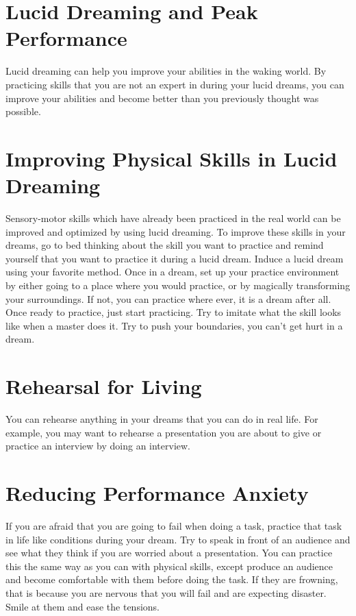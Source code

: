 \documentclass{report}
\begin{document}
\section{Lucid Dreaming and Peak Performance}
Lucid dreaming can help you improve your abilities in the waking world. By practicing skills that you are not an expert in during your lucid dreams, you can improve your abilities and become better than you previously thought was possible. 

\section{Improving Physical Skills in Lucid Dreaming}
Sensory-motor skills which have already been practiced in the real world can be improved and optimized by using lucid dreaming. To improve these skills in your dreams, go to bed thinking about the skill you want to practice and remind yourself that you want to practice it during a lucid dream. Induce a lucid dream using your favorite method. Once in a dream, set up your practice environment by either going to a place where you would practice, or by magically transforming your surroundings. If not, you can practice where ever, it is a dream after all. Once ready to practice, just start practicing. Try to imitate what the skill looks like when a master does it. Try to push your boundaries, you can't get hurt in a dream. 

\section{Rehearsal for Living}
You can rehearse anything in your dreams that you can do in real life. For example, you may want to rehearse a presentation you are about to give or practice an interview by doing an interview. 

\section{Reducing Performance Anxiety}
If you are afraid that you are going to fail when doing a task, practice that task in life like conditions during your dream. Try to speak in front of an audience and see what they think if you are worried about a presentation. You can practice this the same way as you can with physical skills, except produce an audience and become comfortable with them before doing the task. If they are frowning, that is because you are nervous that you will fail and are expecting disaster. Smile at them and ease the tensions. 
\end{document}
